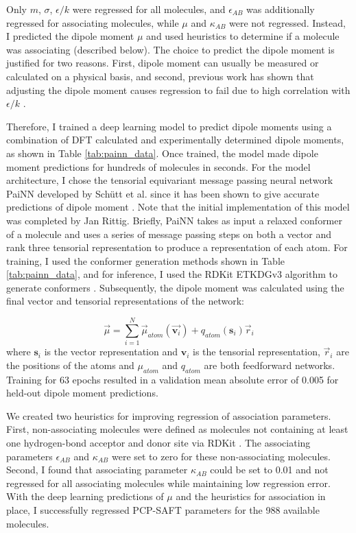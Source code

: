 Only $m$, $\sigma$, $\epsilon/k$ were regressed for all molecules, and $\epsilon_{AB}$ was additionally regressed for associating molecules, while $\mu$ and $\kappa_{AB}$ were not regressed. Instead, I predicted the dipole moment $\mu$ and used heuristics to determine if a molecule was associating (described below). The choice to predict the dipole moment is justified for two reasons. First, dipole moment can usually be measured or calculated on a physical basis, and second, previous work has shown that adjusting the dipole moment causes regression to fail due to high correlation with $\epsilon/k$ \cite{Cripwell2017, deVilliers2011}. 

Therefore, I trained a deep learning model to predict dipole moments using a combination of DFT calculated and experimentally determined dipole moments, as shown in Table \ref{tab:painn_data}.  Once trained, the model made dipole moment predictions for hundreds of molecules in seconds. For the model architecture, I chose the tensorial equivariant message passing neural network PaiNN developed by Schütt et al. since it has been shown to give accurate predictions of dipole moment \cite{Schutt2021}. Note that the initial implementation of this model was completed by Jan Rittig. Briefly, PaiNN takes as input a relaxed conformer of a molecule and uses a series of message passing steps on both a vector and rank three tensorial representation to produce a representation of each atom. For training, I used the conformer generation methods shown in Table \ref{tab:painn_data}, and for inference, I used the RDKit ETKDGv3 algorithm to generate conformers \cite{Wang2020}. Subsequently, the dipole moment was calculated using the final vector and tensorial representations of the network:

\begin{equation}
    \vec \mu = \sum_{i=1}^N \vec \mu_{atom}(\vec{\mathbf v_i}) + q_{atom}(\mathbf s_i)\vec r_i
\end{equation}
where $\mathbf s_i$ is the vector representation and $\mathbf v_i$ is the tensorial representation, $\vec r_i$ are the positions of the atoms and $\mu_{atom}$ and $q_{atom}$ are both feedforward networks. Training for 63 epochs resulted in a validation mean absolute error of 0.005 for held-out dipole moment predictions.

We created two heuristics for improving regression of association parameters. First, non-associating molecules were defined as molecules not containing at least one hydrogen-bond acceptor and donor site via RDKit \cite{rdkit}. The associating parameters $\epsilon_{AB}$ and $\kappa_{AB}$ were set to zero for these non-associating molecules. Second, I found that associating parameter $\kappa_{AB}$ could be set to 0.01 and not regressed for all associating molecules while maintaining low regression error. With the deep learning predictions of $\mu$ and the heuristics for association in place, I successfully regressed PCP-SAFT parameters for the 988 available molecules. 

